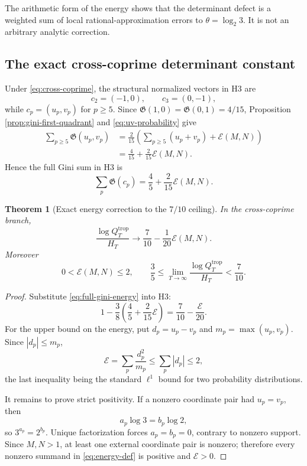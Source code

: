 \documentclass[11pt,oneside]{article}
\theoremstyle{research}
\newtheorem{theorem}{Theorem}[section]
\theoremstyle{definition}
\newcommand{\E}{\mathcal E}
\newcommand{\trop}{\mathrm{trop}}
\begin{document}
The arithmetic form of the energy shows that the determinant defect is a
weighted sum of local rational-approximation errors to $\theta=\log_2 3$.
It is not an arbitrary analytic correction.

\subsection{The exact cross-coprime determinant constant}

Under \eqref{eq:cross-coprime}, the structural normalized vectors in H3 are
\[
 c_2=(-1,0),\qquad c_3=(0,-1),
\]
while $c_p=(u_p,v_p)$ for $p\ge5$.  Since
$\mathfrak G(1,0)=\mathfrak G(0,1)=4/15$, Proposition
\ref{prop:gini-first-quadrant} and \eqref{eq:uv-probability} give
\begin{align}
 \sum_{p\ge5}\mathfrak G(u_p,v_p)
 &=\frac2{15}\left(
     \sum_{p\ge5}(u_p+v_p)+\E(M,N)
   \right) \\
 &=\frac4{15}+\frac2{15}\E(M,N).
 \label{eq:external-gini-energy}
\end{align}
Hence the full Gini sum in H3 is
\begin{equation}
 \sum_p\mathfrak G(c_p)
 =\frac45+\frac2{15}\E(M,N).
 \label{eq:full-gini-energy}
\end{equation}

\begin{theorem}[Exact energy correction to the $7/10$ ceiling]
\label{thm:exact-cross-coprime-ceiling}
In the cross-coprime branch,
\begin{equation}
 \frac{\log Q_T^{\trop}}{H_T}
 \longrightarrow
 \frac7{10}-\frac1{20}\E(M,N).
 \label{eq:exact-cross-coprime-ceiling}
\end{equation}
Moreover
\begin{equation}
 0<\E(M,N)\le2,
 \qquad
 \frac35\le
 \lim_{T\to\infty}\frac{\log Q_T^{\trop}}{H_T}
 <\frac7{10}.
 \label{eq:energy-range}
\end{equation}
\end{theorem}

\begin{proof}
Substitute \eqref{eq:full-gini-energy} into H3:
\[
 1-\frac38\left(\frac45+\frac2{15}\E\right)
 =\frac7{10}-\frac{\E}{20}.
\]
For the upper bound on the energy, put $d_p=u_p-v_p$ and
$m_p=\max(u_p,v_p)$.  Since $|d_p|\le m_p$,
\[
 \E=\sum_p\frac{d_p^2}{m_p}
 \le\sum_p|d_p|\le2,
\]
the last inequality being the standard $\ell^1$ bound for two probability
distributions.

It remains to prove strict positivity.  If a nonzero coordinate pair had
$u_p=v_p$, then
\[
 a_p\log3=b_p\log2,
\]
so $3^{a_p}=2^{b_p}$.  Unique factorization forces
$a_p=b_p=0$, contrary to nonzero support.  Since $M,N>1$, at least one
external coordinate pair is nonzero; therefore every nonzero summand in
\eqref{eq:energy-def} is positive and $\E>0$.
\end{proof}
\end{document}
